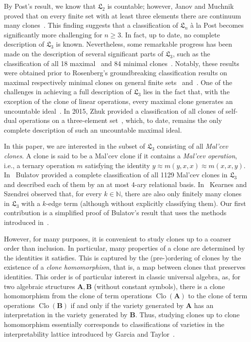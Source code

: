 \documentclass[12pt]{amsart}
\theoremstyle{definition}
\theoremstyle{definition}
\newcommand{\N}{\mathbb{N}}
\newcommand{\alg}[1]{\mathbf{#1}}
\newcommand{\algA}{\alg{A}}
\newcommand{\algB}{\alg{B}}
\DeclareMathOperator{\Clo}{Clo}
\begin{document}
By Post's result, we know that $\mathfrak{L}_2$ is countable; however, Janov and Muchnik proved that on every finite set with at least three elements there are continuum many clones~\cite{3elem}. This finding suggests that a classification of $\mathfrak{L}_n$ \`{a} la Post becomes significantly more challenging for $n\geq 3$. In fact, up to date, no complete description of $\mathfrak{L}_3$ is known. Nevertheless, some remarkable progress has been made on the description of several significant parts of $\mathfrak{L}_3$, such as the classification of all 18 maximal~\cite{JabMaximal} and 84 minimal clones~\cite{Csakany84}. Notably, these results were obtained prior to Rosenberg’s groundbreaking classification results on maximal respectively minimal clones on general finite sets~\cite{RosenbergMaximal} and~\cite{Rosenberg}. One of the challenges in achieving a full description of $\mathfrak{L}_3$ lies in the fact that, with the exception of the clone of linear operations, every maximal clone generates an uncountable ideal~\cite{DemetrHannak, Marchenkov}. In 2015, Zhuk provided a classification of all clones of self-dual operations on a three-element set~\cite{Zhuk15}, which, to date, remains the only complete description of such an uncountable maximal ideal.

In this paper, we are interested in the subset of $\mathfrak{L}_3$ consisting of all \emph{Mal'cev clones}. A clone is said to be a Mal'cev clone if it contains a \emph{Mal'cev operation}, i.e., a ternary operation $m$ satisfying the identity $y \approx m(y,x,x) \approx m(x,x,y)$. In~\cite{BulatovImportante} Bulatov provided a complete classification of all 1129 Mal'cev clones in $\mathfrak L_3$ and described each of them by an at most 4-ary relational basis. In~\cite{KS-parallelogramterms} Kearnes and Szendrei observed that, for every $k \in \N$, there are also only finitely many clones in $\mathfrak{L}_3$ with a $k$-edge term (although without explicitly classifying them). Our first contribution is a simplified proof of Bulatov's result that uses the methods introduced in~\cite{KS-parallelogramterms}.

However, for many purposes, it is convenient to study clones up to a coarser order than inclusion. In particular, many properties of a clone are determined by the identities it satisfies. This is captured by the (pre-)ordering of clones by the existence of a \emph{clone homomorphism}, that is, a map between clones that preserves identities. This order is of particular interest in classic universal algebra, as, for two algebraic structures $\algA, \algB$ (without constant symbols), there is a clone homomorphism from the clone of term operations $\Clo(\algA)$ to the clone of term operations $\Clo(\algB)$ if and only if the variety generated by $\algA$ has an interpretation in the variety generated by $\algB$. Thus, studying clones up to clone homomorphism essentially corresponds to classifications of varieties in the interpretability lattice introduced by Garcia and Taylor~\cite{garciaTaylor}.
\end{document}
